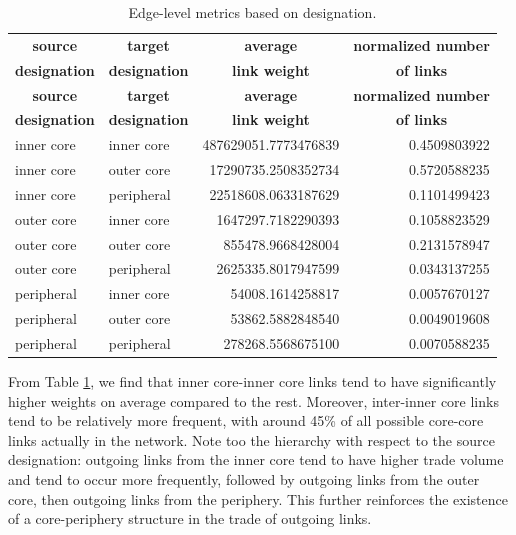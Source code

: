 \documentclass[12pt,letterpaper]{report}
\begin{document}
				\begin{longtable}{|l|l|r|r|}
					\caption{Edge-level metrics based on designation. \label{tab:tab06EdgeLevel}} \\
					\hline
					\multicolumn{1}{|c|}{\textbf{\small source}} & \multicolumn{1}{|c|}{\textbf{\small target}} & \multicolumn{1}{|c|}{\textbf{\small average}} & \textbf{\small normalized number} \\ 
					\multicolumn{1}{|c|}{\textbf{\small designation}} & \multicolumn{1}{|c|}{\textbf{\small designation}} & \multicolumn{1}{|c|}{\textbf{\small link weight}} & \multicolumn{1}{|c|}{\textbf{\small of links}} \\ 
					\hline
					\endfirsthead
					\hline
					\multicolumn{1}{|c|}{\textbf{\small source}} & \multicolumn{1}{|c|}{\textbf{\small target}} & \multicolumn{1}{|c|}{\textbf{\small average}} & \textbf{\small normalized number} \\ 
					\multicolumn{1}{|c|}{\textbf{\small designation}} & \multicolumn{1}{|c|}{\textbf{\small designation}} & \multicolumn{1}{|c|}{\textbf{\small link weight}} & \multicolumn{1}{|c|}{\textbf{\small of links}} \\ 
					\hline
					\endhead
					\hline
					\endfoot
					inner core & inner core & 487629051.7773476839 & 0.4509803922 \\
					inner core & outer core & 17290735.2508352734 & 0.5720588235 \\
					inner core & peripheral & 22518608.0633187629 & 0.1101499423 \\
					outer core & inner core & 1647297.7182290393
					 & 0.1058823529 \\
					outer core & outer core & 855478.9668428004
					 & 0.2131578947 \\
					outer core & peripheral & 2625335.8017947599
					& 0.0343137255 \\
					peripheral & inner core & 54008.1614258817 & 0.0057670127 \\
					peripheral & outer core & 53862.5882848540 & 0.0049019608 \\
					peripheral & peripheral & 278268.5568675100 & 0.0070588235 \\
				\end{longtable}
			
				From Table \ref{tab:tab06EdgeLevel}, we find that inner core-inner core links tend to have significantly higher weights on average compared to the rest. Moreover, inter-inner core links tend to be relatively more frequent, with around 45\% of all possible core-core links actually in the network. Note too the hierarchy with respect to the source designation: outgoing links from the inner core tend to have higher trade volume and tend to occur more frequently, followed by outgoing links from the outer core, then outgoing links from the periphery. This further reinforces the existence of a core-periphery structure in the trade of outgoing links.
				
\end{document}
